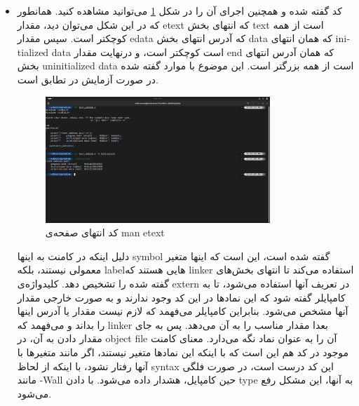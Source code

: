 \documentclass[12pt]{article}
\begin{document}
        \begin{itemize}
        \item 
        کد گفته شده و همچنین اجرای آن را در شکل 
        \ref{im11}
        می‌توانید مشاهده کنید. همانطور که در این شکل می‌توان دید، مقدار 
        \textenglish{etext}
        که انتهای بخش
        \textenglish{text}
        است از همه کوچکتر است. سپس مقدار
        \textenglish{edata}
        که آدرس انتهای بخش 
        \textenglish{data}
        که همان انتهای
        \textenglish{initialized data}
        است کوچکتر است، و درنهایت مقدار
        \textenglish{end}
        که همان آدرس انتهای بخش
        \textenglish{uninitialized data}
        است از همه بزرگتر است. این موضوع با موارد گفته شده در صورت آزمایش در تطابق است.

        \begin{figure}[H]
		\centering
		\includegraphics[width=0.8\textwidth]{report6-resources/11.png}
		\caption{کد انتهای صفحه‌ی \textenglish{man etext}}
            \label{im11}
	\end{figure}

        دلیل اینکه در کامنت به اینها 
        \textenglish{symbol}
        گفته شده است، این است که اینها متغیر معمولی نیستند، بلکه
        \textenglish{label}هایی
        هستند که 
        \textenglish{linker}
        استفاده می‌کند تا انتهای بخش‌های گفته شده را تشخیص دهد. کلیدواژه‌ی 
        \textenglish{extern}
        در تعریف آنها استفاده می‌شود، تا به کامپایلر گفته شود که این نمادها در این کد وجود ندارند و به صورت خارجی مقدار آنها مشخص می‌شود. بنابراین کامپایلر می‌فهمد که لازم نیست مقدار یا آدرس اینها را بداند و می‌فهمد که 
        \textenglish{linker}
        بعدا مقدار مناسب را به آن می‌دهد. پس به جای مقدار دادن به آن، در
        \textenglish{object file}
        آن را به عنوان نماد نگه می‌دارد. معنای کامنت موجود در کد هم این است که با اینکه این نمادها متغیر نیستند، اگر مانند متغیرها با آنها رفتار نشود، با اینکه از لحاظ 
        \textenglish{syntax}
        این کد درست است، در صورت فلگی مانند
        \textenglish{-Wall}
        حین کامپایل، هشدار داده می‌شود. با دادن
        \textenglish{type}
        به آنها، این مشکل رفع می‌شود.


\end{itemize}
\end{document}
